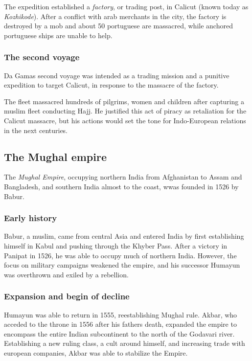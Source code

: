 \documentclass[11pt, a4paper, headings=standardclasses]{scrartcl}
\begin{document}
The expedition established a \emph{factory}, or trading post, in Calicut (known today as \textit{Kozhikode}). After a conflict with arab merchants in the city, the factory is destroyed by a mob and  about 50 portuguese are massacred, while anchored portuguese ships are unable to help.\autocite{1550}

\subsubsection{The second voyage}

Da Gamas second voyage was intended as a trading mission and a punitive expedition to target Calicut, in response to the massacre of the factory.\autocite{Vasco}

The fleet massacred hundreds of pilgrims, women and children after capturing a muslim fleet conducting Hajj. He justified this act of piracy as retaliation for the Calicut massacre,\autocite{1550} but his actions would set the tone for Indo-European relations in the next centuries.

\subsection{The Mughal empire}

The \emph{Mughal Empire}, occupying northern India from Afghanistan to Assam and Bangladesh, and southern India almost to the coast, wwas founded in 1526 by Babur.

\subsubsection{Early history}

Babur, a muslim, came from central Asia and entered India by first establishing himself in Kabul and pushing through the Khyber Pass. After a victory in Panipat in 1526, he was able to occupy much of northern India. However, the focus on military campaigns weakened the empire, and his successor Humayun was overthrown and exiled by a rebellion.

\subsubsection{Expansion and begin of decline}

Humayun was able to return in 1555, reestablishing Mughal rule. Akbar, who acceded to the throne in 1556 after his fathers death, expanded the empire to encompass the entire Indian subcontinent to the north of the Godavari river. Establishing a new ruling class, a cult around himself, and increasing trade with european companies, Akbar was able to stabilize the Empire.
\end{document}
